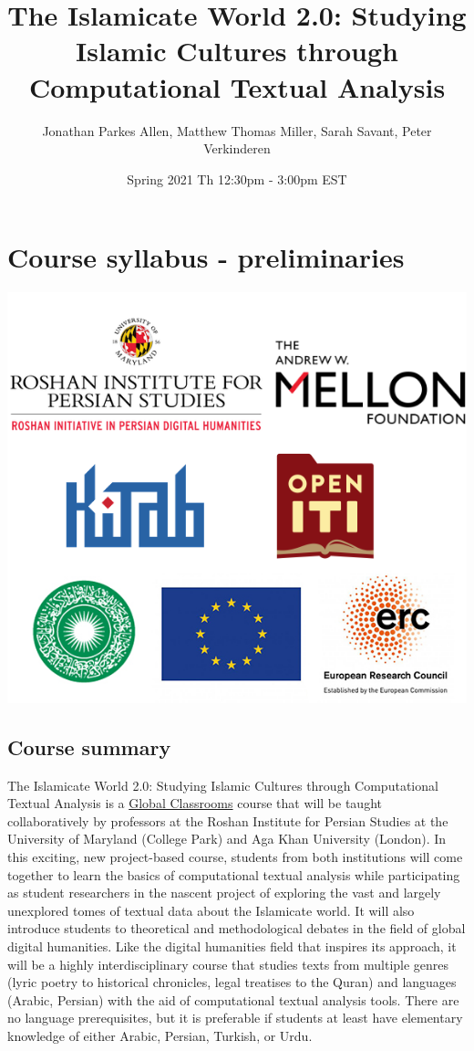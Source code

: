 \documentclass[
]{book}
\title{The Islamicate World 2.0: Studying Islamic Cultures through Computational Textual Analysis}
\author{Jonathan Parkes Allen, Matthew Thomas Miller, Sarah Savant, Peter Verkinderen}
\date{Spring 2021 Th 12:30pm - 3:00pm EST}
\begin{document}
\maketitle

{
\setcounter{tocdepth}{1}
\tableofcontents
}
\hypertarget{course-syllabus---preliminaries}{%
\chapter{Course syllabus - preliminaries}\label{course-syllabus---preliminaries}}

\includegraphics{img/logos.png}

\hypertarget{course-summary}{%
\section{Course summary}\label{course-summary}}

The Islamicate World 2.0: Studying Islamic Cultures through Computational Textual Analysis is a \href{https://globalmaryland.umd.edu/content/global-classrooms}{Global Classrooms} course that will be taught collaboratively by professors at the Roshan Institute for Persian Studies at the University of Maryland (College Park) and Aga Khan University (London). In this exciting, new project-based course, students from both institutions will come together to learn the basics of computational textual analysis while participating as student researchers in the nascent project of exploring the vast and largely unexplored tomes of textual data about the Islamicate world. It will also introduce students to theoretical and methodological debates in the field of global digital humanities. Like the digital humanities field that inspires its approach, it will be a highly interdisciplinary course that studies texts from multiple genres (lyric poetry to historical chronicles, legal treatises to the Quran) and languages (Arabic, Persian) with the aid of computational textual analysis tools. There are no language prerequisites, but it is preferable if students at least have elementary knowledge of either Arabic, Persian, Turkish, or Urdu.
\end{document}

